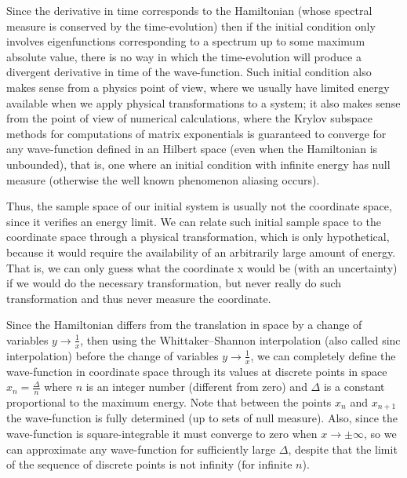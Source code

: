 \documentclass[11pt]{book}
\begin{document}
Since the derivative in time corresponds to the Hamiltonian (whose
spectral measure is conserved by the time-evolution) then if the initial
condition only involves eigenfunctions corresponding to a spectrum up to
some maximum absolute value, there is no way in which the time-evolution
will produce a divergent derivative in time of the wave-function. Such
initial condition also makes sense from a physics point of view, where
we usually have limited energy available when we apply physical
transformations to a system; it also makes sense from the point of view
of numerical calculations, where the Krylov subspace methods for
computations of matrix exponentials is guaranteed to converge for any
wave-function defined in an Hilbert
space\cite{hashimoto_shift-invert_2019}\cite{hashimoto_shift-invert_2016} (even when the Hamiltonian is unbounded), that is, one
where an initial condition with infinite energy has null measure
(otherwise the well known phenomenon aliasing occurs).

Thus, the sample space of our initial system is usually not the
coordinate space, since it verifies an energy limit. We can relate such
initial sample space to the coordinate space through a physical
transformation, which is only hypothetical, because it would require the
availability of an arbitrarily large amount of energy. That is, we can
only guess what the coordinate x would be (with an uncertainty) if we
would do the necessary transformation, but never really do such
transformation and thus never measure the coordinate.

Since the Hamiltonian differs from the translation in space by a change
of variables \(y\to \frac{1}{x}\), then using the Whittaker--Shannon
interpolation (also called sinc interpolation) before the change of
variables \(y\to \frac{1}{x}\), we can completely define the
wave-function in coordinate space through its values at discrete points
in space \(x_n=\frac{\Delta}{n}\) where \(n\) is an integer number
(different from zero) and \(\Delta\) is a constant proportional to the
maximum energy. Note that between the points \(x_n\) and \(x_{n+1}\) the
wave-function is fully determined (up to sets of null measure). Also,
since the wave-function is square-integrable it must converge to zero
when \(x\to \pm\infty\), so we can approximate any wave-function for
sufficiently large \(\Delta\), despite that the limit of the sequence of
discrete points is not infinity (for infinite \(n\)).
\end{document}
